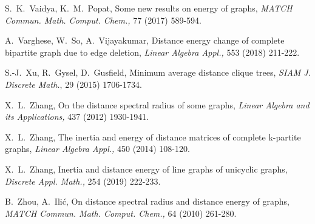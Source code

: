 \documentclass[10pt]{article}
\begin{document}
\begin{thebibliography}{}

S.~K.~Vaidya, K.~M.~Popat, Some new results on energy of graphs, {\it MATCH Commun.
Math. Comput. Chem.,} 77 (2017) 589-594.

A.~Varghese, W.~So, A.~Vijayakumar,  Distance energy change of complete bipartite graph due to edge deletion, {\it Linear Algebra Appl.,} 553 (2018) 211-222.


S.-J.~Xu, R.~Gysel, D.~Gusfield,
Minimum average distance clique trees,
{\it SIAM J. Discrete Math.}, 29 (2015) 1706-1734.

 X.~L.~Zhang, On the distance spectral radius of some
graphs, {\it Linear Algebra and its Applications,}  437 (2012) 1930-1941.

X.~L.~Zhang, The inertia and energy of distance matrices of complete k-partite graphs, {\it Linear Algebra
Appl.,} 450 (2014) 108-120.

X.~L.~Zhang,  Inertia and distance energy of line graphs of unicyclic graphs, {\it Discrete Appl. Math.,} 254 (2019) 222-233.

B.~Zhou, A.~Ili\'{c}, On distance spectral radius and distance energy of graphs, {\it MATCH Commun. Math. Comput. Chem.,}  64 (2010) 261-280.
\end{thebibliography}
\end{document}
